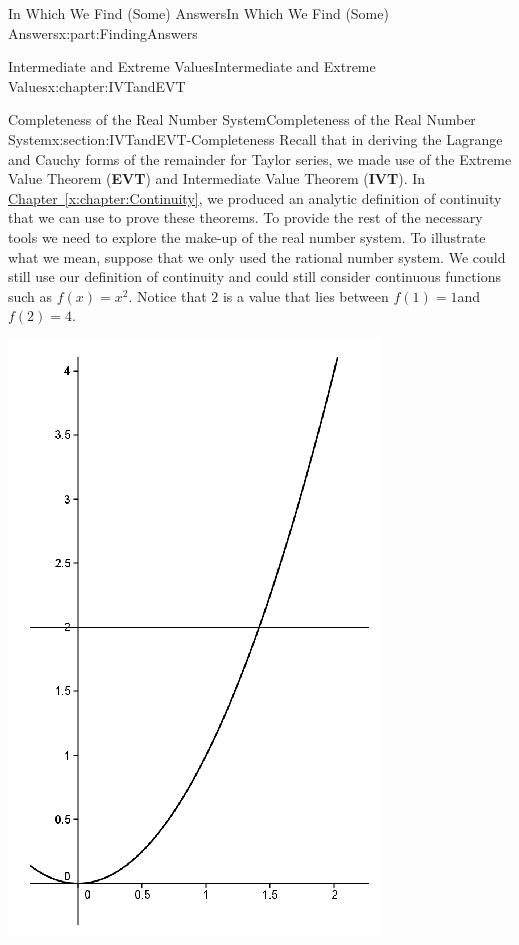 \documentclass[oneside,10pt,]{book}
\newcommand{\xreffont}{\relax}
\newcommand{\terminology}[1]{\textbf{#1}}
\numberwithin{equation}{section}
\begin{document}
\begin{partptx}{In Which We Find (Some) Answers}{}{In Which We Find (Some) Answers}{}{}{x:part:FindingAnswers}
\begin{chapterptx}{Intermediate and Extreme Values}{}{Intermediate and Extreme Values}{}{}{x:chapter:IVTandEVT}
\begin{sectionptx}{Completeness of the Real Number System}{}{Completeness of the Real Number System}{}{}{x:section:IVTandEVT-Completeness}
Recall that in deriving the Lagrange and Cauchy forms of the remainder for Taylor series, we made use of the Extreme Value Theorem (\terminology{EVT}) and Intermediate Value Theorem (\terminology{IVT}). In \hyperref[x:chapter:Continuity]{Chapter~{\xreffont\ref{x:chapter:Continuity}}}, we produced an analytic definition of continuity that we can use to prove these theorems. To provide the rest of the necessary tools we need to explore the make-up of the real number system. To illustrate what we mean, suppose that we only used the rational number system. We could still use our definition of continuity and could still consider continuous functions such as \(f(x)=x^2\). Notice that \(2\) is a value that lies between \(f(1)=1\)and \(f(2)=4\).%
\begin{image}{0.315}{0.37}{0.315}%
\includegraphics[width=\linewidth]{images/Ch6fig1.png}

\end{image}
\end{sectionptx}
\end{chapterptx}
\end{partptx}
\end{document}
